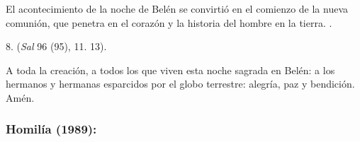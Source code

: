 \begin{body}
	El acontecimiento de la noche de Belén se convirtió en el comienzo de la nueva comunión, que penetra en el corazón y la historia del hombre en la tierra. .
	
	8.  (\emph{Sal} 96 (95), 11. 13).
	
	A toda la creación, a todos los que viven esta noche sagrada en Belén: a los hermanos y hermanas esparcidos por el globo terrestre: alegría, paz y bendición. Amén.
\end{body}

\subsubsection{Homilía (1989):}


